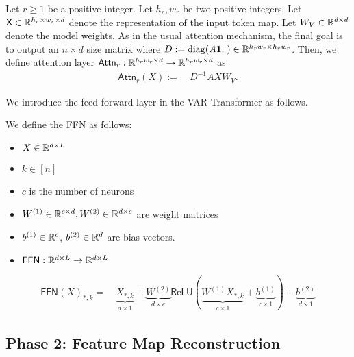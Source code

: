 \begin{definition}\label{def:single_layer_var_transformer}
    Let $r \geq 1$ be a positive integer. Let $h_r, w_r$ be two positive integers. 
     Let $\mathsf{X} \in \mathbb{R}^{h_r \times w_r \times d}$ denote the representation of the input token map. Let $W_V \in \mathbb{R}^{d \times d}$ denote the model weights. As in the usual attention mechanism, the final goal is to output an $n \times d$ size matrix where $D:= \operatorname{diag}( A {\bf 1}_n) \in \mathbb{R}^{h_rw_r \times h_rw_r}$. Then, we define attention layer $\mathsf{Attn}_r: \mathbb{R}^{h_rw_r \times d} \to \mathbb{R}^{h_rw_r \times d}$ as
    \begin{align*}
        \mathsf{Attn}_r (X) := & ~ D^{-1} A X W_V .
    \end{align*}
\end{definition}

We introduce the feed-forward layer in the VAR Transformer as follows.

\begin{definition}\label{def:ffn}
We define the FFN as follows:
    \begin{itemize}
        \item $X \in \mathbb{R}^{d\times L}$
        \item $k \in [n]$
        \item $c$ is the number of neurons
        \item $W^{(1)} \in \mathbb{R}^{c \times d}, W^{(2)} \in \mathbb{R}^{d \times c}$ are weight matrices
        \item $b^{(1)}\in \mathbb{R}^{ c}$, $ b^{(2)} \in \mathbb{R}^{d}$ are bias vectors.
        \item $\mathsf{FFN}: \mathbb{R}^{d\times L} \to \mathbb{R}^{d\times L}$ 
    \end{itemize}
    
    \begin{align*}
        \mathsf{FFN}(X)_{*,k} =
        & ~ \underbrace{X_{*,k}}_{d \times 1} +  \underbrace{W^{(2)}}_{d \times c} \mathsf{ReLU}( \underbrace{ W^{(1)} X_{*,k} }_{c\times 1} + \underbrace{b^{(1)}}_{c\times 1})  + \underbrace{b^{(2)}}_{d \times 1} 
    \end{align*}
    
\end{definition}

\subsection{Phase 2: Feature Map Reconstruction }\label{sec:phase_2}

